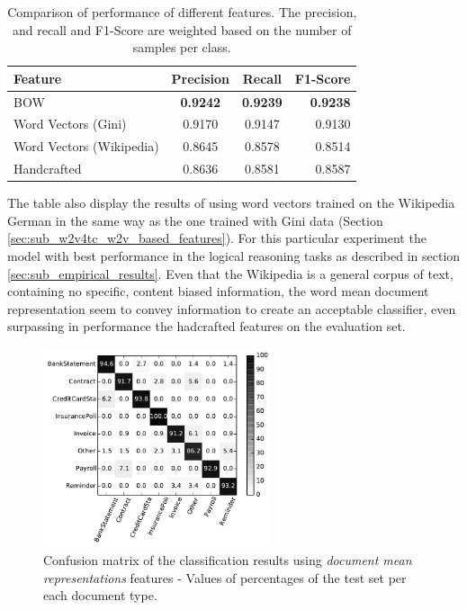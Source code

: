 \begin{table}[ht!]
  \centering
  \caption{Comparison of performance of different features. The precision,
    and recall and F1-Score are weighted based on the number of samples per class.}
  \label{tab:w2v4tc_ginig_w2v_main_comparisson}
  
  \small
  \begin{tabular}{|l|c|c|r|}
    \hline
    Feature                   &  Precision  &  Recall  &  F1-Score  \\
    \hline
    \ac{BOW}                  &     \textbf{0.9242}  & \textbf{ 0.9239}  &   \textbf{ 0.9238}  \\
    Word Vectors (Gini)       &     0.9170  &  0.9147  &    0.9130  \\
    Word Vectors (Wikipedia)  &     0.8645  &  0.8578  &    0.8514  \\
    Handcrafted               &     0.8636  &  0.8581  &    0.8587  \\  
   \hline
  \end{tabular}
\end{table}

The table also display the results of using word vectors trained on the
Wikipedia German in the same way as the one trained with Gini data (Section
\ref{sec:sub_w2v4tc_w2v_based_features}). For this particular experiment the
model with best performance in the logical reasoning tasks as described in
section \ref{sec:sub_empirical_results}.  Even that the Wikipedia is a
general corpus of text, containing no specific, content biased information,
the word mean document representation seem to convey information to create an
acceptable classifier, even surpassing in performance the hadcrafted features
on the evaluation set. 
 
 
\begin{figure}[!htbp]
    \centering
    \includegraphics[width=0.6\textwidth]{images/002-xvalidaton-dmr.pdf}
    \caption{Confusion matrix of the classification results  using \textit{document mean
      representations} features - Values of percentages of the test set per
    each document type.}
    \label{fig:confusion-matrix-dmr}
\end{figure}

